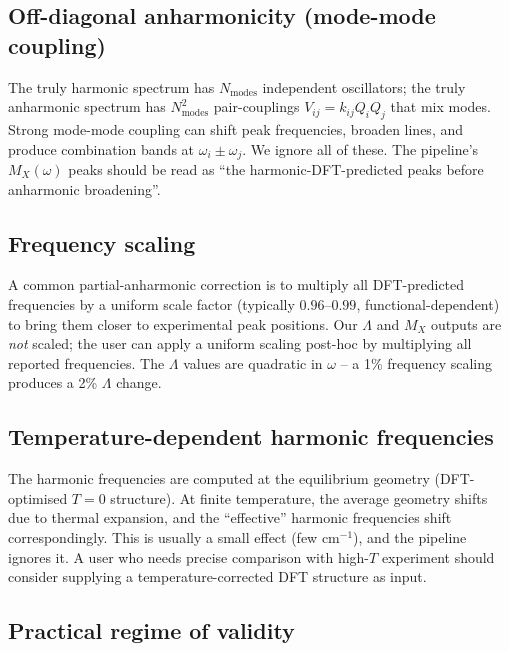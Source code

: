 \documentclass[10pt,a4paper,twoside]{article}
\begin{document}
\subsection{Off-diagonal anharmonicity (mode-mode coupling)}

The truly harmonic spectrum has $N_\text{modes}$ independent
oscillators; the truly anharmonic spectrum has $N_\text{modes}^2$
pair-couplings $V_{ij} = k_{ij} Q_i Q_j$ that mix modes. Strong
mode-mode coupling can shift peak frequencies, broaden lines, and
produce combination bands at $\omega_i \pm \omega_j$. We ignore
all of these. The pipeline's $M_X(\omega)$ peaks should be read
as ``the harmonic-DFT-predicted peaks before anharmonic
broadening''.

\subsection{Frequency scaling}

A common partial-anharmonic correction is to multiply all
DFT-predicted frequencies by a uniform scale factor (typically
$0.96$--$0.99$, functional-dependent) to bring them closer to
experimental peak positions. Our $\Lambda$ and $M_X$ outputs are
\emph{not} scaled; the user can apply a uniform scaling
post-hoc by multiplying all reported frequencies. The
$\Lambda$ values are quadratic in $\omega$ -- a 1\% frequency
scaling produces a 2\% $\Lambda$ change.

\subsection{Temperature-dependent harmonic frequencies}

The harmonic frequencies are computed at the equilibrium geometry
(DFT-optimised $T = 0$ structure). At finite temperature, the
average geometry shifts due to thermal expansion, and the
``effective'' harmonic frequencies shift correspondingly. This is
usually a small effect (few cm$^{-1}$), and the pipeline ignores
it. A user who needs precise comparison with high-$T$ experiment
should consider supplying a temperature-corrected DFT structure
as input.

\subsection{Practical regime of validity}
\end{document}
